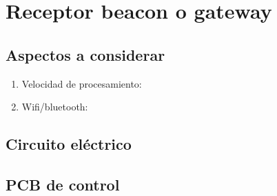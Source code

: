 \documentclass[a4paper ,12pt, onecolumn]{article}
\begin{document}
\section{Receptor beacon o gateway}
    \subsection{Aspectos a considerar}
        \begin{enumerate}
            \item Velocidad de procesamiento:
            \item Wifi/bluetooth:
        \end{enumerate}
    \subsection{Circuito eléctrico}
    \subsection{PCB de control}
\end{document}
